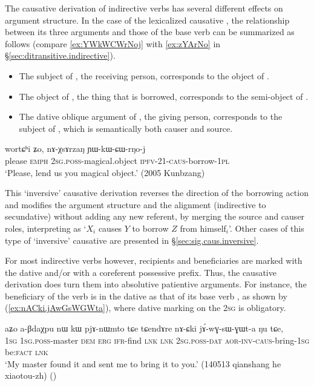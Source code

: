 The causative derivation of indirective verbs has several different effects on argument structure. In the case of the lexicalized causative , the relationship between its three arguments and those of the base verb  can be summarized as follows (compare \ref{ex:YWkWCWrNoj} with \ref{ex:zYArNo} in §\ref{sec:ditransitive.indirective}).

\begin{itemize}
	\item The subject of , the receiving person, corresponds to the object of .
	\item The object of , the thing that is borrowed, corresponds to the semi-object of .
	\item The dative oblique argument of , the giving person, corresponds to the subject of , which is semantically both causer and source.
\end{itemize}

\begin{exe}
	\ex \label{ex:YWkWCWrNoj}
	\gll  wortɕʰi ʑo, nɤ-χsɤrzaŋ ɲɯ-kɯ-ɕɯ-rŋo-j \\
	please \textsc{emph} \textsc{2sg}.\textsc{poss}-magical.object \textsc{ipfv}-2\fl{}1-\textsc{caus}-borrow-\textsc{1pl} \\
	\glt `Please, lend us you magical object.' (2005 Kunbzang)
\end{exe}

This `inversive' causative derivation reverses the direction of the borrowing action and modifies the argument structure and the alignment (indirective to secundative) without adding any new referent, by merging the source and causer roles, interpreting  as `$X_i$ causes $Y$ to borrow $Z$ from himself$_i$'. Other cases of this type of `inversive' causative are presented in §\ref{sec:sig.caus.inversive}.

For most indirective verbs however, recipients and beneficiaries are marked with the dative and/or with a coreferent possessive prefix. Thus, the causative derivation does turn them into absolutive patientive arguments. For instance, the beneficiary of the verb  is in the dative as that of its base verb , as shown by (\ref{ex:nACki.jAwGsWGWta}), where dative marking on the \textsc{2sg} is obligatory.

\begin{exe}
	\ex \label{ex:nACki.jAwGsWGWta}
	\gll   aʑo a-βdaχpu nɯ kɯ pjɤ-nɯmto tɕe tɕendɤre nɤ-ɕki jɤ́-wɣ-sɯ-ɣɯt-a ŋu tɕe, \\
	\textsc{1sg} \textsc{1sg}.\textsc{poss}-master \textsc{dem} \textsc{erg} \textsc{ifr}-find \textsc{lnk} \textsc{lnk} \textsc{2sg}.\textsc{poss}-\textsc{dat} \textsc{aor}-\textsc{inv}-\textsc{caus}-bring-\textsc{1sg} be:\textsc{fact} \textsc{lnk} \\
	\glt `My master found it and sent me to bring it to you.' (140513 qianshang he xiaotou-zh)
()
\end{exe}


